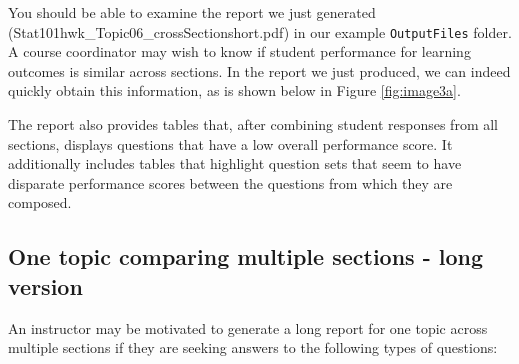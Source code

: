 \documentclass{article}\usepackage[]{graphicx}\usepackage[]{color}
\numberwithin{equation}{section} %
\begin{document}
You should be able to examine the report we just generated (Stat101hwk\_Topic06\_crossSection\-short.pdf) in our example \texttt{OutputFiles} folder. A course coordinator may wish to know if student performance for learning outcomes is similar across sections. In the report we just produced, we can indeed quickly obtain this information, as is shown below in Figure \ref{fig:image3a}.

\begin{center}
\captionsetup{width=0.6\textwidth}
\label{fig:image3a}
\end{center}

The report also provides tables that, after combining student responses from all sections, displays questions that have a low overall performance score. It additionally includes tables that highlight question sets that seem to have disparate performance scores between the questions from which they are composed.

\subsection{One topic comparing multiple sections - long version}

An instructor may be motivated to generate a long report for one topic across multiple sections if they are seeking answers to the following types of questions:
\end{document}
